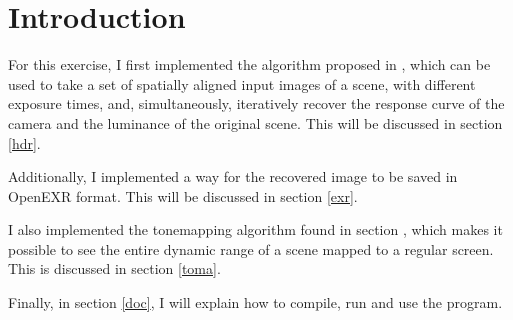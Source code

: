 \section{Introduction}\label{intro}

For this exercise, I first implemented the algorithm proposed in \cite{rbs99},
which can be used to take a set of spatially aligned input images of a scene,
with different exposure times, and, simultaneously, iteratively recover the
response curve of the camera and the luminance of the original scene. This will
be discussed in section \ref{hdr}.

Additionally, I implemented a way for the recovered image to be saved in
OpenEXR format. This will be discussed in section \ref{exr}.

I also implemented the tonemapping algorithm found in section \cite{dmac03},
which makes it possible to see the entire dynamic range of a scene mapped to a
regular screen. This is discussed in section \ref{toma}.

Finally, in section \ref{doc}, I will explain how to compile, run and use the
program.
